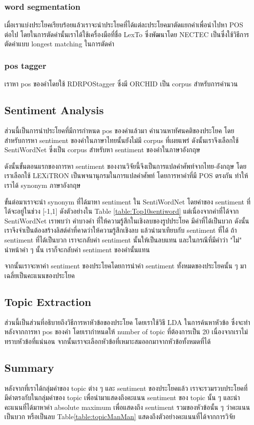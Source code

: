 \subsubsection{word segmentation}
เมื่อเราแบ่งประโยคเรียบร้อยแล้วเราจะนำประโยคที่ได้แต่ละประโยคมาตัดแยกคำเพื่อนำไปหา POS ต่อไป โดยในการตัดคำนั้นเราได้ใช้เครื่องมือที่ชื่อ LexTo ซึ่งพัฒนาโดย NECTEC เป็นซึ่งใช้วิธีการตัดคำแบบ longest matching 
ในการตัดคำ
\subsubsection{pos tagger}
เราหา pos ของคำโดยใช้ RDRPOStagger ซึ่งมี ORCHID เป็น corpus สำหรับการคำนวน
\subsection{Sentiment Analysis}
ส่วนนี้เป็นการนำประโยคที่มีการกำหนด pos ของคำแล้วมา คำนวนหาทัศนคติของประโยค โดยสำหรับการหา sentiment ของคำในภาษาไทยนั้นยังไม่มี corpus ที่เผยแพร่ ดังนั้นเราจึงเลือกใช้ SentiWordNet \cite{SentiWordNet} ซึ่งเป็น corpus สำหรับหา sentiment ของคำในภาษาอังกฤษ 

ดังนั้นขั้นตอนแรกของการหา sentiment ของงานวิจัยนี้จึงเป็นการแปลคำศัพท์จากไทย-อังกฤษ โดยเราเลือกใช้ LEXiTRON \cite{LEXiTRON} เป็นพจนานุกรมในการแปลคำศัพท์ โดยการหาคำที่มี POS ตรงกัน ทำให้เราได้ synonym ภาษาอังกฤษ

ขั้นต่อมาเราจะนำ synonym ที่ได้มาหา sentiment ใน SentiWordNet โดยค่าของ sentiment ที่ได้จะอยู่ในช่วง [-1,1] ดังตัวอย่างใน Table \ref{table:Top10sentiword}
แต่เนื่องจากค่าที่ได้จาก SentiWordNet เราพบว่า คำบางคำ ที่ให้ความรู้สึกในเชิงลบของรูปประโยค มีค่าที่ได้เป็นบวก ดังนั้นเราจึงจำเป็นต้องสร้างลิสต์คำที่คาดว่าให้ความรู้สึกเชิงลบ แล้วนำมาเทียบกับ sentiment ที่ได้ ถ้า sentiment ที่ได้เป็นบวก เราจะกลับค่า sentiment นั้นให้เป็นลบแทน และในกรณีที่มีคำว่า "ไม่" นำหน้าคำ ๆ นั้น เราก็จะกลับค่า sentiment ของคำนั้นแทน

จากนั้นเราจะหาค่า sentiment ของประโยคโดยการนำค่า sentiment ทั้งหมดของประโยคนั้น ๆ มาเฉลี่ยเป็นคะแนนของประโยค
\subsection{Topic Extraction}
ส่วนนี้เป็นส่วนที่อธิบายถึงวิธีการหาหัวข้อของประโยค โดยเราใช้วิธี LDA ในการค้นหาหัวข้อ ซึ่งจะทำหลังจากการหา pos ของคำ
โดยเรากำหนดให้ number of topic ที่ต้องการเป็น 20 เนื่องจากเราไม่ทราบหัวข้อที่แน่นอน จากนั้นเราจะเลือกหัวข้อที่เหมาะสมออกมาจากหัวข้อทั้งหมดที่ได้
\subsection{Summary}
หลังจากที่เราได้กลุ่มคำของ topic ต่าง ๆ และ sentiment ของประโยคแล้ว เราจะรวมรวบประโยคที่มีคำตรงกับในกลุ่มคำของ topic เพื่อนำมาแสดงถึงคะแนน sentiment ของ topic นั้น ๆ และนำคะแนนที่ได้มาหาค่า absolute maximum เพื่อแสดงถึง sentiment รวมของหัวข้อนั้น ๆ ว่าคะแนนเป็นบวก หรือเป็นลบ Table\ref{table:topicManMan} แสดงถึงตัวอย่างคะแนนที่ได้จากการวิจัย

